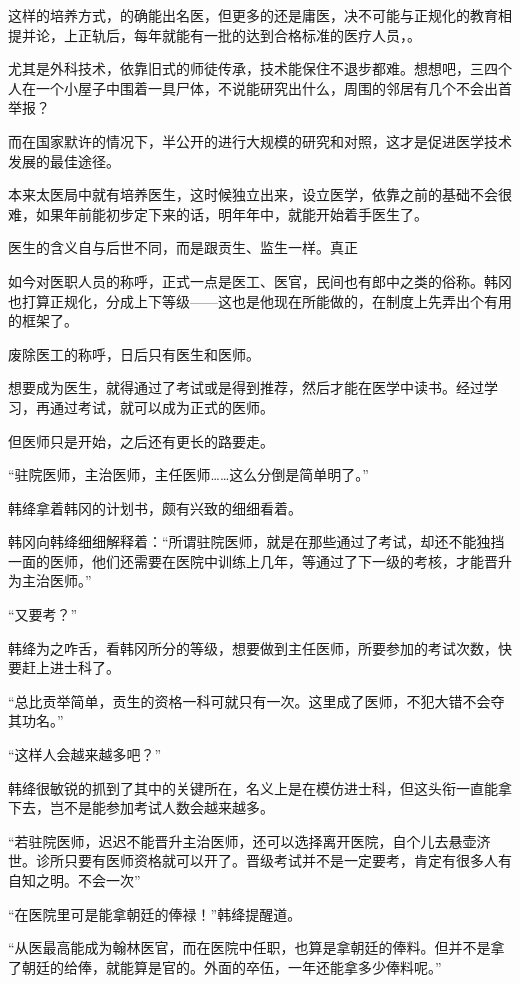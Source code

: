 这样的培养方式，的确能出名医，但更多的还是庸医，决不可能与正规化的教育相提并论，上正轨后，每年就能有一批的达到合格标准的医疗人员，。

尤其是外科技术，依靠旧式的师徒传承，技术能保住不退步都难。想想吧，三四个人在一个小屋子中围着一具尸体，不说能研究出什么，周围的邻居有几个不会出首举报？

而在国家默许的情况下，半公开的进行大规模的研究和对照，这才是促进医学技术发展的最佳途径。

本来太医局中就有培养医生，这时候独立出来，设立医学，依靠之前的基础不会很难，如果年前能初步定下来的话，明年年中，就能开始着手医生了。

医生的含义自与后世不同，而是跟贡生、监生一样。真正

如今对医职人员的称呼，正式一点是医工、医官，民间也有郎中之类的俗称。韩冈也打算正规化，分成上下等级——这也是他现在所能做的，在制度上先弄出个有用的框架了。

废除医工的称呼，日后只有医生和医师。

想要成为医生，就得通过了考试或是得到推荐，然后才能在医学中读书。经过学习，再通过考试，就可以成为正式的医师。

但医师只是开始，之后还有更长的路要走。

“驻院医师，主治医师，主任医师……这么分倒是简单明了。”

韩绛拿着韩冈的计划书，颇有兴致的细细看着。

韩冈向韩绛细细解释着：“所谓驻院医师，就是在那些通过了考试，却还不能独挡一面的医师，他们还需要在医院中训练上几年，等通过了下一级的考核，才能晋升为主治医师。”

“又要考？”

韩绛为之咋舌，看韩冈所分的等级，想要做到主任医师，所要参加的考试次数，快要赶上进士科了。

“总比贡举简单，贡生的资格一科可就只有一次。这里成了医师，不犯大错不会夺其功名。”

“这样人会越来越多吧？”

韩绛很敏锐的抓到了其中的关键所在，名义上是在模仿进士科，但这头衔一直能拿下去，岂不是能参加考试人数会越来越多。

“若驻院医师，迟迟不能晋升主治医师，还可以选择离开医院，自个儿去悬壶济世。诊所只要有医师资格就可以开了。晋级考试并不是一定要考，肯定有很多人有自知之明。不会一次”

“在医院里可是能拿朝廷的俸禄！”韩绛提醒道。

“从医最高能成为翰林医官，而在医院中任职，也算是拿朝廷的俸料。但并不是拿了朝廷的给俸，就能算是官的。外面的卒伍，一年还能拿多少俸料呢。”

